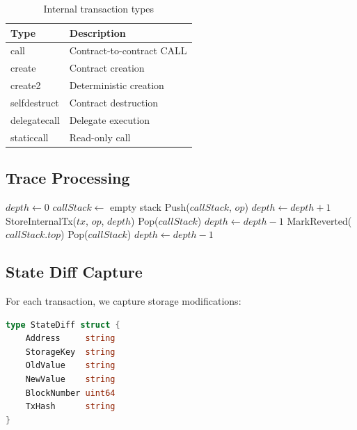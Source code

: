 \documentclass[11pt,twocolumn]{article}
\begin{document}
\begin{table}[h]
\centering
\caption{Internal transaction types}
\begin{tabular}{@{}ll@{}}
\toprule
Type & Description \\
\midrule
call & Contract-to-contract CALL \\
create & Contract creation \\
create2 & Deterministic creation \\
selfdestruct & Contract destruction \\
delegatecall & Delegate execution \\
staticcall & Read-only call \\
\bottomrule
\end{tabular}
\label{tab:trace-types}
\end{table}

\subsection{Trace Processing}

\begin{algorithm}
\caption{Transaction Trace Processing}
\begin{algorithmic}[1]
    \State $depth \gets 0$
    \State $callStack \gets$ empty stack
            \State Push($callStack$, $op$)
            \State $depth \gets depth + 1$
            \State StoreInternalTx($tx$, $op$, $depth$)
            \State Pop($callStack$)
            \State $depth \gets depth - 1$
            \State MarkReverted($callStack.top$)
            \State Pop($callStack$)
            \State $depth \gets depth - 1$
        \EndIf
    \EndFor
\EndProcedure
\end{algorithmic}
\end{algorithm}

\subsection{State Diff Capture}

For each transaction, we capture storage modifications:

\begin{lstlisting}[language=Go,caption={State diff structure}]
type StateDiff struct {
    Address     string
    StorageKey  string
    OldValue    string
    NewValue    string
    BlockNumber uint64
    TxHash      string
}
\end{lstlisting}
\end{document}
